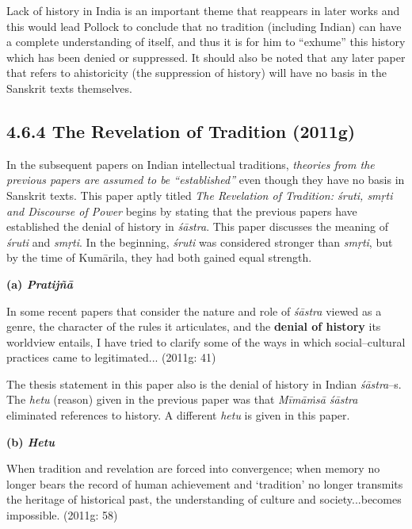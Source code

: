 Lack of history in India is an important theme that reappears in later works and this would lead Pollock to conclude that no tradition (including Indian) can have a complete understanding of itself, and thus it is for him to “exhume” this history which has been denied or suppressed. It should also be noted that any later paper that refers to ahistoricity (the suppression of history) will have no basis in the Sanskrit texts themselves.

\vspace{-.3cm}

\subsection*{4.6.4 The Revelation of Tradition (2011g)}

In the subsequent papers on Indian intellectual traditions, \textit{theories from the previous papers are assumed to be “established”} even though they have no basis in Sanskrit texts. This paper aptly titled \textit{The Revelation of Tradition: śruti, smṛti and Discourse of Power} begins by stating that the previous papers have established the denial of history in \textit{śāstra}. This paper discusses the meaning of \textit{śruti} and \textit{smṛti}. In the beginning, \textit{śruti} was considered stronger than \textit{smṛti}, but by the time of Kumārila, they had both gained equal strength.

\textbf{(a) \textit{Pratijñā}}

\begin{myquote}
In some recent papers that consider the nature and role of \textit{śāstra }viewed as a genre, the character of the rules it articulates, and the \textbf{denial of history} its worldview entails, I have tried to clarify some of the ways in which social–cultural practices came to legitimated... (2011g: 41)
\end{myquote}

The thesis statement in this paper also is the denial of history in Indian \textit{śāstra}–s. The \textit{hetu} (reason) given in the previous paper was that \textit{Mīmāṁsā śāstra} eliminated references to history. A different \textit{hetu} is given in this paper.

\vspace{.15cm}

\textbf{(b) \textit{Hetu}}

\begin{myquote}
When tradition and revelation are forced into convergence; when memory no longer bears the record of human achievement and ‘tradition’ no longer transmits the heritage of historical past, the understanding of culture and society...becomes impossible. (2011g: 58)
\end{myquote}

